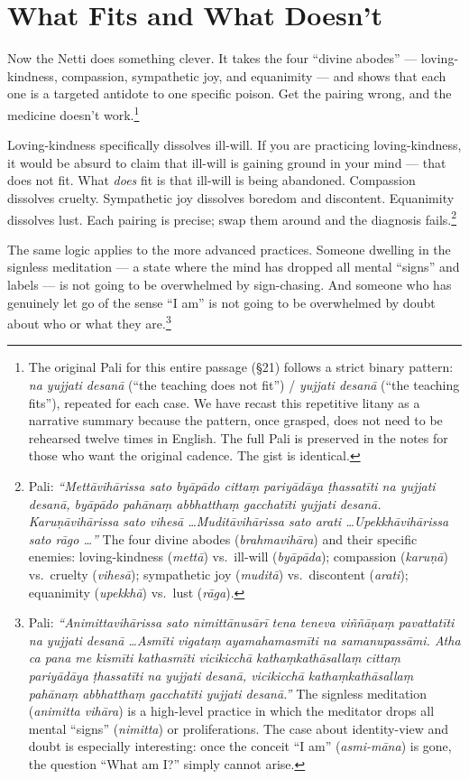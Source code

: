 \section*{What Fits and What Doesn't}

Now the Netti does something clever. It takes the four ``divine abodes'' --- loving-kindness, compassion, sympathetic joy, and equanimity --- and shows that each one is a targeted antidote to one specific poison. Get the pairing wrong, and the medicine doesn't work.\footnote{The original Pali for this entire passage (\S21) follows a strict binary pattern: \textit{na yujjati desanā} (``the teaching does not fit'') / \textit{yujjati desanā} (``the teaching fits''), repeated for each case. We have recast this repetitive litany as a narrative summary because the pattern, once grasped, does not need to be rehearsed twelve times in English. The full Pali is preserved in the notes for those who want the original cadence. The gist is identical.}

Loving-kindness specifically dissolves ill-will. If you are practicing loving-kindness, it would be absurd to claim that ill-will is gaining ground in your mind --- that does not fit. What \textit{does} fit is that ill-will is being abandoned. Compassion dissolves cruelty. Sympathetic joy dissolves boredom and discontent. Equanimity dissolves lust. Each pairing is precise; swap them around and the diagnosis fails.\footnote{Pali: \textit{``Mettāvihārissa sato byāpādo cittaṃ pariyādāya ṭhassatīti na yujjati desanā, byāpādo pahānaṃ abbhatthaṃ gacchatīti yujjati desanā. Karuṇāvihārissa sato vihesā \ldots Muditāvihārissa sato arati \ldots Upekkhāvihārissa sato rāgo \ldots''} The four divine abodes (\textit{brahmavihāra}) and their specific enemies: loving-kindness (\textit{mettā}) vs.\ ill-will (\textit{byāpāda}); compassion (\textit{karuṇā}) vs.\ cruelty (\textit{vihesā}); sympathetic joy (\textit{muditā}) vs.\ discontent (\textit{arati}); equanimity (\textit{upekkhā}) vs.\ lust (\textit{rāga}).}

The same logic applies to the more advanced practices. Someone dwelling in the signless meditation --- a state where the mind has dropped all mental ``signs'' and labels --- is not going to be overwhelmed by sign-chasing. And someone who has genuinely let go of the sense ``I am'' is not going to be overwhelmed by doubt about who or what they are.\footnote{Pali: \textit{``Animittavihārissa sato nimittānusārī tena teneva viññāṇaṃ pavattatīti na yujjati desanā \ldots Asmīti vigataṃ ayamahamasmīti na samanupassāmi. Atha ca pana me kismīti kathasmīti vicikicchā kathaṃkathāsallaṃ cittaṃ pariyādāya ṭhassatīti na yujjati desanā, vicikicchā kathaṃkathāsallaṃ pahānaṃ abbhatthaṃ gacchatīti yujjati desanā.''} The signless meditation (\textit{animitta vihāra}) is a high-level practice in which the meditator drops all mental ``signs'' (\textit{nimitta}) or proliferations. The case about identity-view and doubt is especially interesting: once the conceit ``I am'' (\textit{asmi-māna}) is gone, the question ``What am I?'' simply cannot arise.}

